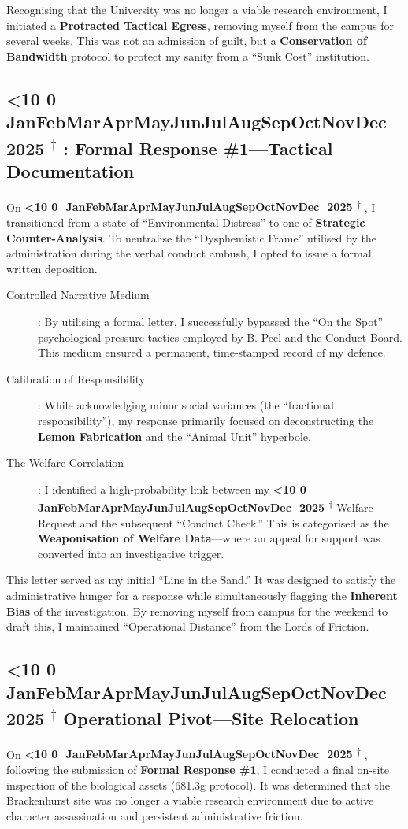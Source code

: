 \documentclass{EMBASSY}
\DeclareRobustCommand{\gmt}[3]{%
    \texorpdfstring{%
        {\color{DateGold}\textbf{%
            \ifnum#1<10 0\fi#1\,\textperiodcentered\,%
            \ifcase#2\or Jan\or Feb\or Mar\or Apr\or May\or Jun\or Jul\or Aug\or Sep\or Oct\or Nov\or Dec\fi
            \,\textperiodcentered\,20#3%
            \textsuperscript{$\dagger$}%
        }}%
    }{%
        (#1/#2/#3)%
    }%
}
\begin{document}
Recognising that the University was no longer a viable research environment, I initiated a \textbf{Protracted Tactical Egress}, removing myself from the campus for several weeks. This was not an admission of guilt, but a \textbf{Conservation of Bandwidth} protocol to protect my sanity from a ``Sunk Cost'' institution.

\subsection{\gmt{9}{11}{25}: Formal Response \#1---Tactical Documentation}
On \gmt{9}{11}{25}, I transitioned from a state of ``Environmental Distress'' to one of \textbf{Strategic Counter-Analysis}. To neutralise the ``Dysphemistic Frame'' utilised by the administration during the verbal conduct ambush, I opted to issue a formal written deposition.

\begin{description}
	\item[Controlled Narrative Medium]: By utilising a formal letter, I successfully bypassed the ``On the Spot'' psychological pressure tactics employed by B. Peel and the Conduct Board. This medium ensured a permanent, time-stamped record of my defence.
	\item[Calibration of Responsibility]: While acknowledging minor social variances (the ``fractional responsibility''), my response primarily focused on deconstructing the \textbf{Lemon Fabrication} and the ``Animal Unit'' hyperbole.
	\item[The Welfare Correlation]: I identified a high-probability link between my \gmt{31}{10}{25} Welfare Request and the subsequent ``Conduct Check.'' This is categorised as the \textbf{Weaponisation of Welfare Data}---where an appeal for support was converted into an investigative trigger.
\end{description}

\noindent This letter served as my initial ``Line in the Sand.'' It was designed to satisfy the administrative hunger for a response while simultaneously flagging the \textbf{Inherent Bias} of the investigation. By removing myself from campus for the weekend to draft this, I maintained ``Operational Distance'' from the Lords of Friction.

\subsection{\gmt{10}{11}{25} Operational Pivot---Site Relocation}
On \gmt{10}{11}{25}, following the submission of \textbf{Formal Response \#1}, I conducted a final on-site inspection of the biological assets (681.3g protocol). It was determined that the Brackenhurst site was no longer a viable research environment due to active character assassination and persistent administrative friction.
\end{document}
